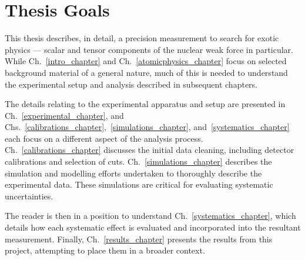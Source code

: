 \section{Thesis Goals}
\label{sec:thesisgoals}
This thesis describes, in detail, a precision measurement to search for exotic physics --- scalar and tensor components of the nuclear weak force in particular.  While Ch.~\ref{intro_chapter} and Ch.~\ref{atomicphysics_chapter} focus on selected background material of a general nature, much of this is needed to understand the experimental setup and analysis described in subsequent chapters.

The details relating to the experimental apparatus and setup are presented in Ch.~\ref{experimental_chapter}, and Chs.~\ref{calibrations_chapter},~\ref{simulations_chapter}, and~\ref{systematics_chapter} each focus on a different aspect of the analysis process.  Ch.~\ref{calibrations_chapter} discusses the initial data cleaning, including detector calibrations and selection of cuts.  Ch.~\ref{simulations_chapter} describes the simulation and modelling efforts undertaken to thoroughly describe the experimental data.  These simulations are critical for evaluating systematic uncertainties.  

The reader is then in a position to understand Ch.~\ref{systematics_chapter}, which details how each systematic effect is evaluated and incorporated into the resultant measurement.  Finally, Ch.~\ref{results_chapter} presents the results from this project, attempting to place them in a broader context. 


{
	\pagebreak
}
{}



















